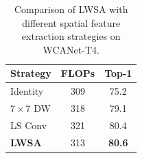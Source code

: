 \documentclass[a4paper,fleqn]{cas-dc}
\begin{document}




\begin{table}[pos=h]
\centering
\caption{Comparison of LWSA with different spatial feature extraction strategies on WCANet-T4.}
\label{tab:ablation_lwsa_attention}
  \begin{tabular}{lcc}
\toprule
Strategy & FLOPs & Top-1 \\
\midrule
Identity & 309 & 75.2 \\
$7\times7$ DW & 318 & 79.1 \\
LS Conv  & 321 & 80.4 \\
\rowcolor[gray]{0.92}
\textbf{LWSA} & 313 & \textbf{80.6} \\
\bottomrule
\end{tabular}
\end{table}
\end{document}
